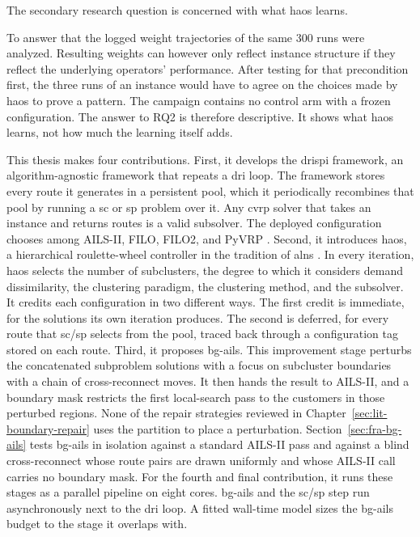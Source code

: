 The secondary research question is concerned with what \gls{haos} learns.


To answer that the logged weight trajectories of the same 300 runs were analyzed. Resulting weights can however only reflect instance structure if they reflect the underlying operators' performance.
After testing for that precondition first, the three runs of an instance would have to agree on the choices made by \gls{haos} to prove a pattern. The campaign contains no control arm with a frozen configuration.
The answer to RQ2 is therefore descriptive. It shows what \gls{haos} learns, not how much the learning itself adds.

This thesis makes four contributions.
First, it develops the \gls{drispi} framework, an algorithm-agnostic framework that repeats a \gls{dri} loop. The framework stores every route it generates in a persistent pool, which it periodically recombines that pool by running a \gls{sc} or \gls{sp} problem over it. Any \gls{cvrp} solver that takes an instance and returns routes is a valid subsolver. The deployed configuration chooses among AILS-II, FILO, FILO2, and PyVRP \citep{woudaPyVRPHighPerformanceVRP2024}.
Second, it introduces \gls{haos}, a hierarchical roulette-wheel controller in the tradition of \gls{alns} \citep{ropkeAdaptiveLargeNeighborhood2006}.
In every iteration, \gls{haos} selects the number of subclusters, the degree to which it considers demand dissimilarity, the clustering paradigm, the clustering method, and the subsolver.
It credits each configuration in two different ways. The first credit is immediate, for the solutions its own iteration produces. The second is deferred, for every route that \gls{sc}/\gls{sp} selects from the pool, traced back through a configuration tag stored on each route.
Third, it proposes \gls{bg-ails}. This improvement stage perturbs the concatenated subproblem solutions with a focus on subcluster boundaries with a chain of cross-reconnect moves. It then hands the result to AILS-II, and a boundary mask restricts the first local-search pass to the customers in those perturbed regions. None of the repair strategies reviewed in Chapter~\ref{sec:lit-boundary-repair} uses the partition to place a perturbation. Section~\ref{sec:fra-bg-ails} tests \gls{bg-ails} in isolation against a standard AILS-II pass and against a blind cross-reconnect whose route pairs are drawn uniformly and whose AILS-II call carries no boundary mask.
For the fourth and final contribution, it runs these stages as a parallel pipeline on eight cores. \gls{bg-ails} and the \gls{sc}/\gls{sp} step run asynchronously next to the \gls{dri} loop. A fitted wall-time model sizes the \gls{bg-ails} budget to the stage it overlaps with.

